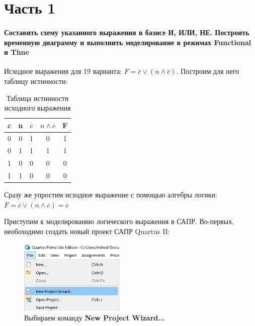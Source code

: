 \documentclass[a4paper,12pt]{article}
\begin{document}

  \section{Часть 1}

  \paragraph{
    Составить схему указанного выражения в базисе И, ИЛИ, НЕ. Построить временную диаграмму
    и выполнить моделирование в режимах Functional и Time
  }

  Исходное выражения для 19 варианта: $F = \overline{c} \lor (n \land \overline{c})$. Построим
  для него таблицу истинности:

  \begin{table}[h]
	\centering
	\begin{tabular}{|c c | c c | c |}
		\hline
        c & n & $\overline{c}$ & $n \land \overline{c}$ & F \\
        \hline
        0 & 0 & 1 & 0 & 1 \\
        0 & 1 & 1 & 1 & 1 \\
        1 & 0 & 0 & 0 & 0 \\
        1 & 1 & 0 & 0 & 0 \\
        \hline      
    \end{tabular}
    \caption{Таблица истинности исходного выражения}
    \label{table:1}
  \end{table}

  Сразу же упростим исходное выражение с помощью алгебры логики: 
  $F = \overline{c} \lor (n \land \overline{c}) = \overline{c}$

  Приступим к моделированию логического выражения в САПР. Во-первых, необоходимо
  создать новый проект САПР Quartus II:

  \begin{figure}[H]
    \centering
    \includegraphics[width=5cm]{01_01}
    \caption{Выбираем команду \textbf{New Project Wizard...}}
  \end{figure}
\end{document}
